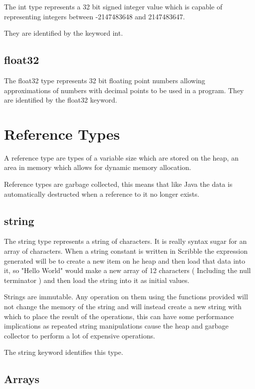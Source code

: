 \documentclass[]{final_report}
\begin{document}
The int type represents a 32 bit signed integer value which is capable of representing integers between -2147483648 and 2147483647.

They are identified by the keyword int. 

\subsection{float32}

The float32 type represents 32 bit floating point numbers allowing approximations of numbers with decimal points to be used in a program. They are identified by the float32 keyword.

\section{Reference Types}

A reference type are types of a variable size which are stored on the heap, an area in memory which allows for dynamic memory allocation.

Reference types are garbage collected, this means that like Java the data is automatically destructed when a reference to it no longer exists.

\subsection{string}

The string type represents a string of characters. It is really syntax sugar for an array of characters. When a string constant is written in Scribble the expression generated will be to create a new item on he heap and then load that data into it, so "Hello World" would make a new array of 12 characters ( Including the null terminator ) and then load the string into it as initial values.

Strings are immutable. Any operation on them using the functions provided will not change the memory of the string and will instead create a new string with which to place the result of the operations, this can have some performance implications as repeated string manipulations cause the heap and garbage collector to perform a lot of expensive operations.

The string keyword identifies this type.

\subsection{Arrays}
\end{document}
